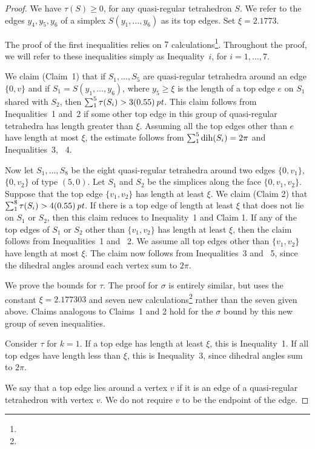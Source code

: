 \begin{proof}
We have $\tau(S)\ge 0$, for any quasi-regular tetrahedron $S$.  We
refer to the edges $y_4,y_5,y_6$ of a simplex $S(y_1,\ldots,y_6)$
as its top edges. Set $\xi=2.1773$.

The proof of the first inequalities relies on $7$
calculations\footnote{}. Throughout the proof, we
will refer to these inequalities simply as Inequality~$i$, for
$i=1,\ldots,7$.

We claim (Claim~1) that if $S_1,\ldots,S_5$ are quasi-regular
tetrahedra around an edge $\{0,v\}$ and if $S_1=S(y_1,\ldots,y_6)$,
where $y_5\ge\xi$ is the length of a top edge $e$ on $S_1$ shared
with $S_2$, then $\sum_1^5\tau(S_i) > 3(0.55)\,\hbox{\it pt}$.  This claim
follows from Inequalities~1 and~2 if some other top edge in this
group of quasi-regular tetrahedra has length greater than $\xi$.
Assuming all the top edges other than $e$ have length at most
$\xi$, the estimate follows from $\sum_1^5\operatorname{dih}(S_i)=2\pi$ and
Inequalities~3, ~4.

Now let $S_1,\ldots,S_8$ be the eight quasi-regular tetrahedra
around two edges $\{0,v_1\}$, $\{0,v_2\}$ of type $(5,0)$. Let $S_1$
and $S_2$ be the simplices along the face $\{0,v_1,v_2\}$. Suppose
that the top edge $\{v_1,v_2\}$ has length at least $\xi$. We claim
(Claim 2) that $\sum_1^8\tau(S_i)> 4(0.55)\,\hbox{\it pt}$.  If there is a
top edge of length at least $\xi$ that does not lie on $S_1$ or
$S_2$, then this claim reduces to Inequality~1 and Claim 1. If any
of the top edges of $S_1$ or $S_2$ other than $\{v_1,v_2\}$ has
length at least $\xi$, then the claim follows from Inequalities~1
and ~2. We assume all top edges other than $\{v_1,v_2\}$ have length
at most $\xi$. The claim now follows from Inequalities~3 and ~5,
since the dihedral angles around each vertex sum to $2\pi$.

We prove the bounds for $\tau$.  The proof for $\sigma$ is
entirely similar, but uses the constant $\xi=2.177303$ and seven
new calculations\footnote{} rather than the seven
given above. Claims analogous to Claims~1 and 2 hold for the
$\sigma$ bound by this new group of seven inequalities.


Consider $\tau$ for $k=1$.  If a top edge has length at least
$\xi$, this is Inequality~1.  If all top edges have length less
than $\xi$, this is Inequality~3, since dihedral angles sum to
$2\pi$.

We say that a top edge lies around a vertex $v$ if it is an edge
of a quasi-regular tetrahedron with vertex $v$. We do not require
$v$ to be the endpoint of the edge.


\end{proof}

